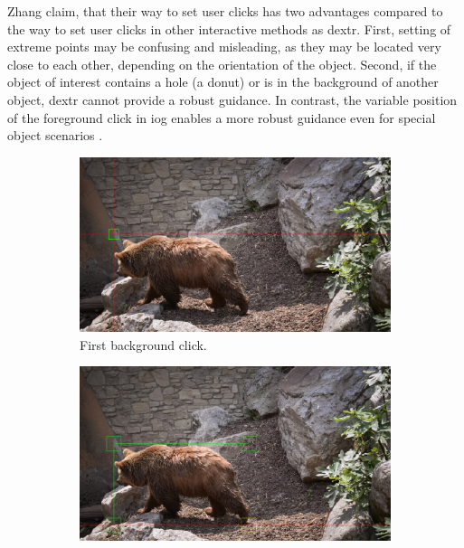 Zhang \etal claim, that their way to set user clicks has two advantages compared to the way to set user clicks in other interactive methods as \gls{dextr}.
First, setting of extreme points may be confusing and misleading, as they may be located very close to each other, depending on the orientation of the object.
Second, if the object of interest contains a hole (\eg a donut) or is in the background of another object, \gls{dextr} cannot provide a robust guidance.
In contrast, the variable position of the foreground click in \gls{iog} enables a more robust guidance even for special object scenarios \cite{Zha20-IOG}.

\begin{figure}
	\centering
	\begin{subfigure}[b]{0.3\textwidth}
		\centering
		\includegraphics[width=\textwidth]{figures/chap34_bear_2.png}
		\caption{First background click.}
		\label{fig:ch3:sec4:iog_workflow_1}
	\end{subfigure}
	\hfill
	\begin{subfigure}[b]{0.3\textwidth}
		\centering
		\includegraphics[width=\textwidth]{figures/chap34_bear_3.png}

\end{subfigure}
\end{figure}
